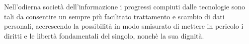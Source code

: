 Nell'odierna società dell'informazione i progressi compiuti dalle tecnologie sono tali da consentire un sempre più facilitato trattamento e scambio di dati personali, accrescendo la possibilità in modo smisurato di mettere in pericolo i diritti e le libertà fondamentali del singolo, nonchè la sua dignità.




